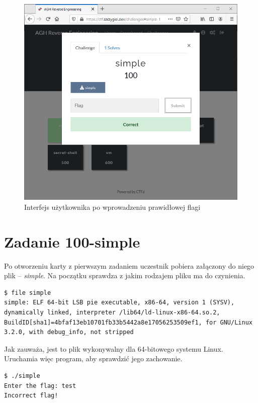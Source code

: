 \documentclass[language=polish,type=eng]{aghmodern}
\begin{document}
\begin{figure}[H]
\centering
\includegraphics[width=\textwidth]{ui_solved}
\caption{Interfejs użytkownika po wprowadzeniu prawidłowej flagi}
\end{figure}

\section{Zadanie 100-simple}

Po otworzeniu karty z pierwszym zadaniem uczestnik pobiera załączony do niego
plik -- \emph{simple}.
Na początku sprawdza z jakim rodzajem pliku ma do czynienia.

\begin{verbatim}
$ file simple
simple: ELF 64-bit LSB pie executable, x86-64, version 1 (SYSV), dynamically linked, interpreter /lib64/ld-linux-x86-64.so.2, BuildID[sha1]=4bfaf13eb10701fb33b5442a8e17056253509ef1, for GNU/Linux 3.2.0, with debug_info, not stripped
\end{verbatim}

Jak zauważa, jest to plik wykonywalny dla 64-bitowego systemu Linux.
Uruchamia więc program, aby sprawdzić jego zachowanie.

\begin{verbatim}
$ ./simple
Enter the flag: test
Incorrect flag!
\end{verbatim}
\end{document}
